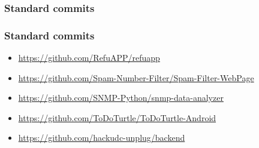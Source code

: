 \documentclass{beamer}
\begin{document}
    \begin{frame}
        \frametitle{Standard commits}
        \begin{figure}[H]
            \centering
            \noindent
        \end{figure}
    \end{frame}
    \begin{frame}
        \frametitle{Standard commits}
        \begin{itemize}
            \item \url{https://github.com/RefuAPP/refuapp}
            \item \url{https://github.com/Spam-Number-Filter/Spam-Filter-WebPage}
            \item \url{https://github.com/SNMP-Python/snmp-data-analyzer}
            \item \url{https://github.com/ToDoTurtle/ToDoTurtle-Android}
            \item \url{https://github.com/hackudc-unplug/backend}
        \end{itemize}
    \end{frame}
\end{document}
